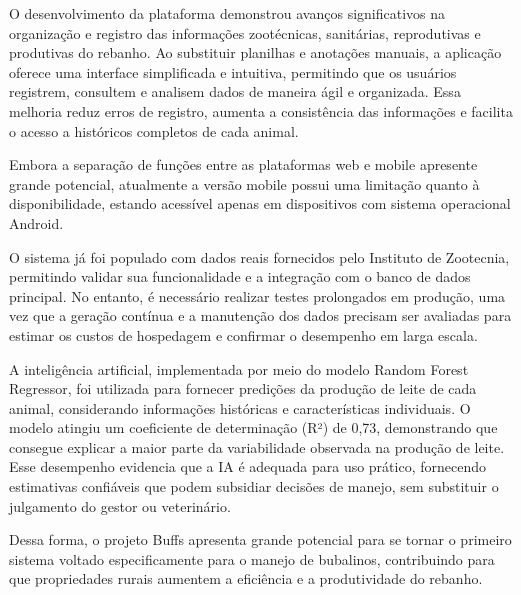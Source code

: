O desenvolvimento da plataforma demonstrou avanços significativos na organização e registro das informações zootécnicas, sanitárias, reprodutivas e produtivas do rebanho. Ao substituir planilhas e anotações manuais, a aplicação oferece uma interface simplificada e intuitiva, permitindo que os usuários registrem, consultem e analisem dados de maneira ágil e organizada. Essa melhoria reduz erros de registro, aumenta a consistência das informações e facilita o acesso a históricos completos de cada animal.

Embora a separação de funções entre as plataformas web e mobile apresente grande potencial, atualmente a versão mobile possui uma limitação quanto à disponibilidade, estando acessível apenas em dispositivos com sistema operacional Android.

O sistema já foi populado com dados reais fornecidos pelo Instituto de Zootecnia, permitindo validar sua funcionalidade e a integração com o banco de dados principal. No entanto, é necessário realizar testes prolongados em produção, uma vez que a geração contínua e a manutenção dos dados precisam ser avaliadas para estimar os custos de hospedagem e confirmar o desempenho em larga escala.

A inteligência artificial, implementada por meio do modelo Random Forest Regressor, foi utilizada para fornecer predições da produção de leite de cada animal, considerando informações históricas e características individuais. O modelo atingiu um coeficiente de determinação (R²) de 0,73, demonstrando que consegue explicar a maior parte da variabilidade observada na produção de leite. Esse desempenho evidencia que a IA é adequada para uso prático, fornecendo estimativas confiáveis que podem subsidiar decisões de manejo, sem substituir o julgamento do gestor ou veterinário.

Dessa forma, o projeto Buffs apresenta grande potencial para se tornar o primeiro sistema voltado especificamente para o manejo de bubalinos, contribuindo para que propriedades rurais aumentem a eficiência e a produtividade do rebanho.
